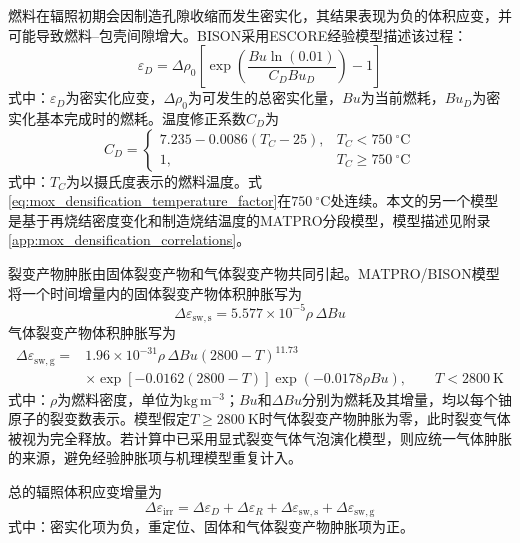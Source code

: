 燃料在辐照初期会因制造孔隙收缩而发生密实化，其结果表现为负的体积应变，并可能导致燃料--包壳间隙增大。BISON采用ESCORE经验模型描述该过程：
\begin{equation}
	\varepsilon_D
	=\Delta\rho_0
	\left[
	\exp\!\left(
	\frac{Bu\ln(0.01)}{C_DBu_D}
	\right)-1
	\right]
	\label{eq:mox_escore_densification}
\end{equation}
式中：$\varepsilon_D$为密实化应变，$\Delta\rho_0$为可发生的总密实化量，$Bu$为当前燃耗，$Bu_D$为密实化基本完成时的燃耗。温度修正系数$C_D$为
\begin{equation}
	C_D=
	\begin{cases}
		7.235-0.0086(T_C-25), & T_C<750\ ^\circ\mathrm{C}\\
		1,                    & T_C\geq750\ ^\circ\mathrm{C}
	\end{cases}
	\label{eq:mox_densification_temperature_factor}
\end{equation}
式中：$T_C$为以摄氏度表示的燃料温度。式\eqref{eq:mox_densification_temperature_factor}在$750\ ^\circ\mathrm{C}$处连续。本文的另一个模型是基于再烧结密度变化和制造烧结温度的MATPRO分段模型，模型描述见附录\ref{app:mox_densification_correlations}。


裂变产物肿胀由固体裂变产物和气体裂变产物共同引起。MATPRO/BISON模型将一个时间增量内的固体裂变产物体积肿胀写为
\begin{equation}
	\Delta\varepsilon_{\mathrm{sw,s}}
	=5.577\times10^{-5}\rho\,\Delta Bu
	\label{eq:mox_solid_fission_product_swelling}
\end{equation}
气体裂变产物体积肿胀写为
\begin{equation}
	\begin{aligned}
		\Delta\varepsilon_{\mathrm{sw,g}}
		={}&1.96\times10^{-31}\rho\,\Delta Bu
		(2800-T)^{11.73}\\
		&\times\exp\!\left[-0.0162(2800-T)\right]
		\exp(-0.0178\rho Bu),
		\qquad T<2800\ \mathrm{K}
	\end{aligned}
	\label{eq:mox_gaseous_fission_product_swelling}
\end{equation}
式中：$\rho$为燃料密度，单位为$\mathrm{kg\,m^{-3}}$；$Bu$和$\Delta Bu$分别为燃耗及其增量，均以每个铀原子的裂变数表示。模型假定$T\geq2800\ \mathrm{K}$时气体裂变产物肿胀为零，此时裂变气体被视为完全释放。若计算中已采用显式裂变气体气泡演化模型，则应统一气体肿胀的来源，避免经验肿胀项与机理模型重复计入。

总的辐照体积应变增量为
\begin{equation}
	\Delta\varepsilon_{\mathrm{irr}}
	=\Delta\varepsilon_D
	+\Delta\varepsilon_R
	+\Delta\varepsilon_{\mathrm{sw,s}}
	+\Delta\varepsilon_{\mathrm{sw,g}}
	\label{eq:mox_total_irradiation_volumetric_strain}
\end{equation}
式中：密实化项为负，重定位、固体和气体裂变产物肿胀项为正。

